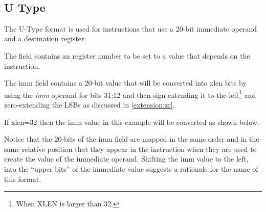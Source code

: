\begin{figure}[ht]
\\
\\
\\
\\
\\
\\
\label{Figure:riscvFormats}
\end{figure}

\subsection{U Type}
\label{insnformat:utype}

The U-Type format is used for instructions that use a 20-bit immediate operand 
and a destination register.
 

The  field contains an  register number to be set to a value that
depends on the instruction.

The imm field 
contains a 20-bit value that will be converted into \Gls{xlen} bits by 
using the {\em imm} operand for bits 31:12 and then sign-extending it 
to the left\footnote{When XLEN is larger than 32.} and zero-extending 
the LSBs as discussed in \autoref{extension:zr}.

If \Gls{xlen}=32 then the imm value in this example will be
converted as shown below.


Notice that the 20-bits of the imm field are mapped in the same order and 
in the same relative position that they appear in the instruction when 
they are used to create the value of the immediate operand.  
Shifting the imm value to the left, into the ``upper bits'' of the immediate 
value suggests a rationale for the name of this format.


